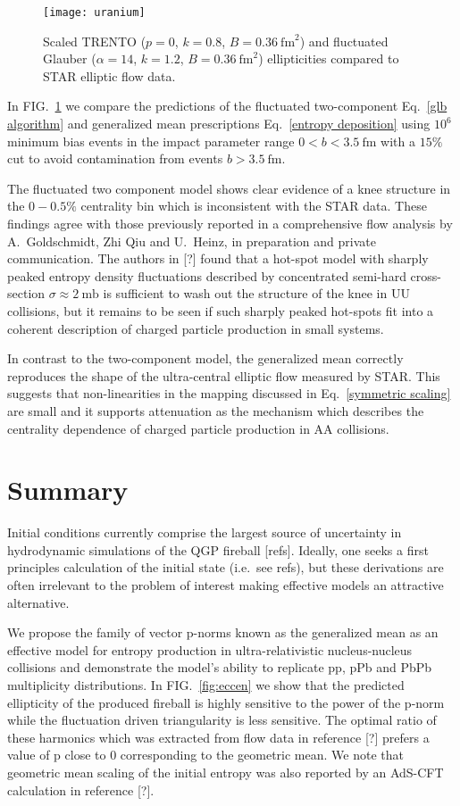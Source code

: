 \documentclass[aps,prl,reprint,amsmath,nofootinbib]{revtex4-1}
\begin{document}
\begin{figure}
  \centering
  \texttt{[image: uranium]}
  \caption{\label{fig:knee}Scaled TRENTO ($p=0$, $k=0.8$, $B=0.36~\mathrm{fm}^2$) and fluctuated Glauber
  ($\alpha=14$, $k=1.2$, $B=0.36~\mathrm{fm}^2$) ellipticities compared to STAR elliptic flow data.}
\end{figure}

In FIG.~\ref{fig:knee} we compare the predictions of the fluctuated two-component Eq.~\eqref{glb algorithm}
and generalized mean prescriptions Eq.~\eqref{entropy deposition} using $10^6$ minimum bias events
in the impact parameter range $0<b<3.5 ~\mathrm{fm}$ with a $15\%$ cut to avoid contamination from events
$b>3.5 ~\mathrm{fm}$.

The fluctuated two component model shows clear evidence of a knee structure in the $0-0.5\%$ centrality bin
which is inconsistent with the STAR data. These findings agree with those previously reported in a
comprehensive flow analysis by A.\ Goldschmidt, Zhi Qiu and U.\ Heinz, in preparation and private communication.
The authors in [?] found that a hot-spot model with sharply peaked entropy density fluctuations described by
concentrated semi-hard cross-section $\sigma \approx 2 ~\mathrm{mb}$ is sufficient to wash out the structure
of the knee in UU collisions, but it remains to be seen if such sharply peaked hot-spots fit into a coherent
description of charged particle production in small systems.

In contrast to the two-component model, the generalized mean correctly reproduces the shape of the
ultra-central elliptic flow measured by STAR. This suggests that non-linearities in the mapping discussed in
Eq.~\eqref{symmetric scaling} are small and it supports attenuation as the mechanism which describes the
centrality dependence of charged particle production in AA collisions.


\section{Summary}

Initial conditions currently comprise the largest source of uncertainty in hydrodynamic simulations of the QGP
fireball [refs]. Ideally, one seeks a first principles calculation of the initial state (i.e.\ see refs), but
these derivations are often irrelevant to the problem of interest making effective models an attractive
alternative.

We propose the family of vector p-norms known as the generalized mean as an effective model for entropy
production in ultra-relativistic nucleus-nucleus collisions and demonstrate the model's ability to
replicate pp, pPb and PbPb multiplicity distributions. In FIG.~\ref{fig:eccen} we show that the predicted
ellipticity of the produced fireball is highly sensitive to the power of the p-norm while the fluctuation
driven triangularity is less sensitive. The optimal ratio of these harmonics which was extracted from flow
data in reference [?] prefers a value of p close to 0 corresponding to the geometric mean. We note that
geometric mean scaling of the initial entropy was also reported by an AdS-CFT calculation in reference [?].
\end{document}

